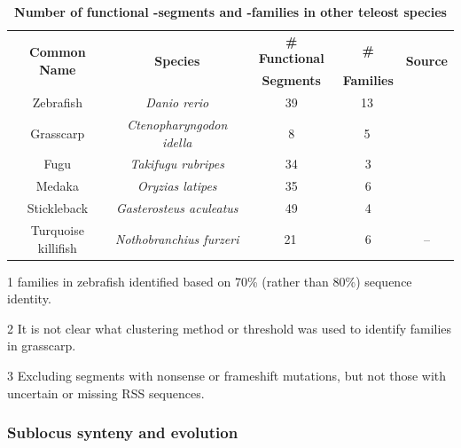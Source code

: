 \begin{table}[ht!]
	\centering
	\begin{threeparttable}
	\centering
	\caption{\textbf{Number of functional \vh-segments and \vh-families in other teleost species}}
	\label{tab:teleost-vh-counts}
	\begin{tabular}{ccccc}\toprule
	\multirow{2}{*}{	\textbf{Common Name}} & \multirow{2}{*}{\textbf{Species}} & \textbf{\# Functional} & \textbf{	\# \vh} & \multirow{2}{*}{\textbf{Source}} \\
	& & \textbf{\vh Segments} & \textbf{Families} & \\\midrule
	Zebrafish & \textit{Danio rerio} & 39 & 13\,\tnote{1} & \parencite{magadan2015fishrepertoires} \\
	Grasscarp & \textit{Ctenopharyngodon idella} & 8 & 5\,\tnote{2} & \parencite{xiao2010grasscarp} \\
	Fugu & \textit{Takifugu rubripes} & 34 & 3 & \parencite{magadan2015fishrepertoires} \\
	Medaka & \textit{Oryzias latipes} & 35 & 6 & \parencite{fillatreau2013astonishing,magadan2011medaka} \\
	Stickleback & \textit{Gasterosteus aculeatus} & 49 & 4 & \parencite{magadan2015fishrepertoires} \\
	Turquoise killifish & \textit{Nothobranchius furzeri} & 21\,\tnote{3} & 6 & -- \\
	\bottomrule\end{tabular}
	\begin{tablenotes}
	\item[1] \vh families in zebrafish identified based on 70\% (rather than 80\%) sequence identity.
	\item[2] It is not clear what clustering method or threshold was used to identify \vh families in grasscarp.
	\item[3] Excluding \vh segments with nonsense or frameshift mutations, but not those with uncertain or missing RSS sequences.
	\end{tablenotes}
	\end{threeparttable}
\end{table}

\subsubsection{Sublocus synteny and evolution}
\label{sec:nfu-locus-variable-synteny}

